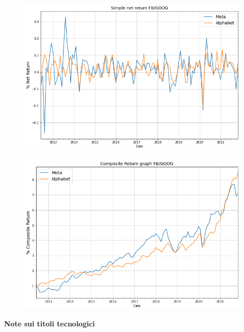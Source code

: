 \documentclass{article}
\begin{document}
\begin{figure}[h]
    \centering
    \begin{minipage}{.5\textwidth}
      \centering
      \includegraphics[width=1\linewidth]{tecno_rendimenti_semplici_netti.png}
      \label{fig:rendimenti_semplici_tecno}
    \end{minipage}%
    \begin{minipage}{.5\textwidth}
      \centering
      \includegraphics[width=.97\linewidth]{tecno_rendimenti_composti.png}
      \label{fig:rendimenti_compositi_tecno}
    \end{minipage}
\end{figure}

\textbf{Note sui titoli tecnologici}
\end{document}
